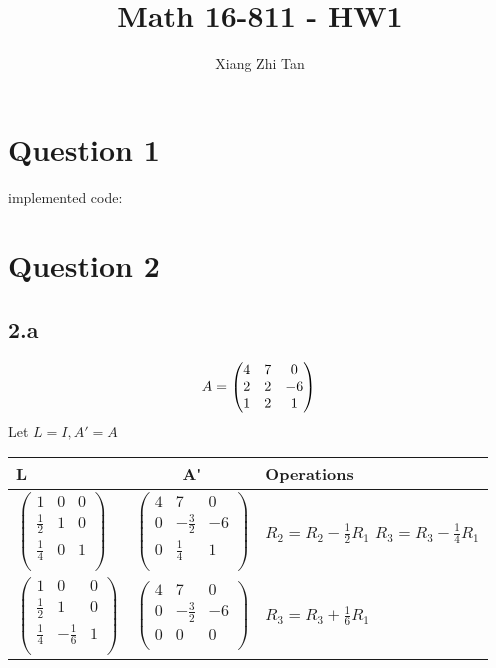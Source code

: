 \documentclass{article}
\begin{document}
\title{Math 16-811 - HW1}
\author{Xiang Zhi Tan}

\maketitle

\section{Question 1}
implemented code:

\section{Question 2}
\subsection*{2.a}
\begin{equation}
A = 
\begin{pmatrix}
    4 & 7 & 0 \\
    2 & 2 & -6 \\
    1 & 2 & 1 \\
\end{pmatrix} 
\\
\end{equation}
Let $ L = I, A' = A$ \\
\begin{tabular}{|l|c|p{5cm}|}
\hline
\textbf{L} & \textbf{A\'} & \textbf{Operations}\\
\hline
$\begin{pmatrix}
    1 & 0 & 0 \\
    \frac{1}{2} & 1 & 0 \\
    \frac{1}{4} & 0 & 1 \\
\end{pmatrix}$
&
$\begin{pmatrix}
    4 & 7 & 0 \\
    0 & -\frac{3}{2} & -6 \\
    0 & \frac{1}{4} & 1 \\
\end{pmatrix}$
&
$R_2 = R_2 - \frac{1}{2} R_1 $ \newline
$R_3 = R_3 - \frac{1}{4} R_1$ \\
\hline
$\begin{pmatrix}
    1 & 0 & 0 \\
    \frac{1}{2} & 1 & 0 \\
    \frac{1}{4} & -\frac{1}{6} & 1 \\
\end{pmatrix}$
&
$\begin{pmatrix}
    4 & 7 & 0 \\
    0 & -\frac{3}{2} & -6 \\
    0 & 0 & 0 \\
\end{pmatrix}$
&
$R_3 = R_3 + \frac{1}{6} R_1$ \\
\hline
\end{tabular} \\
\end{document}
